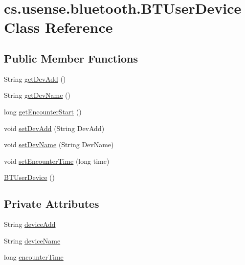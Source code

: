 \hypertarget{classcs_1_1usense_1_1bluetooth_1_1_b_t_user_device}{}\section{cs.\+usense.\+bluetooth.\+B\+T\+User\+Device Class Reference}
\label{classcs_1_1usense_1_1bluetooth_1_1_b_t_user_device}
\subsection*{Public Member Functions}
\begin{DoxyCompactItemize}
\item 
String \hyperlink{classcs_1_1usense_1_1bluetooth_1_1_b_t_user_device_a4afaf1449a8e8ba5719d2ffbf11f37e2}{get\+Dev\+Add} ()
\item 
String \hyperlink{classcs_1_1usense_1_1bluetooth_1_1_b_t_user_device_a53e67439aa9dc013192e34494ed1512a}{get\+Dev\+Name} ()
\item 
long \hyperlink{classcs_1_1usense_1_1bluetooth_1_1_b_t_user_device_ab60f9f6ce3e2b7248d1ab17210fb4f3b}{get\+Encounter\+Start} ()
\item 
void \hyperlink{classcs_1_1usense_1_1bluetooth_1_1_b_t_user_device_a66bd3967d5b70550686f59d378bb3dd3}{set\+Dev\+Add} (String Dev\+Add)
\item 
void \hyperlink{classcs_1_1usense_1_1bluetooth_1_1_b_t_user_device_a3ade291da8730710c86b3052b73a35cb}{set\+Dev\+Name} (String Dev\+Name)
\item 
void \hyperlink{classcs_1_1usense_1_1bluetooth_1_1_b_t_user_device_a961002cb6c23b31ae24abdd7471a642c}{set\+Encounter\+Time} (long time)
\item 
\hyperlink{classcs_1_1usense_1_1bluetooth_1_1_b_t_user_device_a4d63bbf1a9f5444ed60a460a9b2a9d95}{B\+T\+User\+Device} ()
\end{DoxyCompactItemize}
\subsection*{Private Attributes}
\begin{DoxyCompactItemize}
\item 
String \hyperlink{classcs_1_1usense_1_1bluetooth_1_1_b_t_user_device_a407be08735687d3a22ddbc4dc3169156}{device\+Add}
\item 
String \hyperlink{classcs_1_1usense_1_1bluetooth_1_1_b_t_user_device_ac99ff7b60d3884d7e1bc4cef82c9a808}{device\+Name}
\item 
long \hyperlink{classcs_1_1usense_1_1bluetooth_1_1_b_t_user_device_a8b9dc5ad6de9329193e508cdb77212b0}{encounter\+Time}
\end{DoxyCompactItemize}


